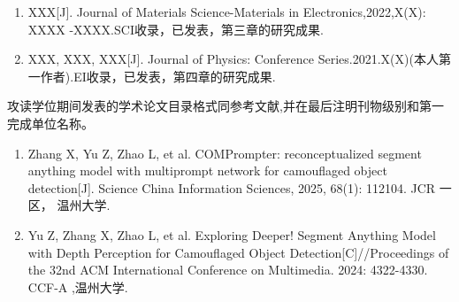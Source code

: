 \documentclass{wzuthesis} %
\begin{document}
\ifdefined\blind  %
    \begin{enumerate}
        \renewcommand{\labelenumi}{[\arabic{enumi}]}
        \setlength{\itemindent}{0em}
        \setlength{\labelsep}{0.5em}
  
        \item XXX[J]. Journal of Materials Science-Materials in Electronics,2022,X(X): XXXX -XXXX.SCI收录，已发表，第三章的研究成果.
        \item  XXX, XXX, XXX[J]. Journal of Physics: Conference Series.2021.X(X)(本人第一作者).EI收录，已发表，第四章的研究成果.
    \end{enumerate}
\else
    攻读学位期间发表的学术论文目录格式同参考文献,并在最后注明刊物级别和第一完成单位名称。
    \begin{enumerate}
        \renewcommand{\labelenumi}{[\arabic{enumi}]}
        \setlength{\itemindent}{0em}
        \setlength{\labelsep}{0.5em}
  
        \item Zhang X, Yu Z, Zhao L, et al. COMPrompter: reconceptualized segment anything model with multiprompt network for camouflaged object detection[J]. Science China Information Sciences, 2025, 68(1): 112104. JCR 一区， 温州大学.
        \item Yu Z, Zhang X, Zhao L, et al. Exploring Deeper! Segment Anything Model with Depth Perception for Camouflaged Object Detection[C]//Proceedings of the 32nd ACM International Conference on Multimedia. 2024: 4322-4330. CCF-A ,温州大学.
    \end{enumerate}
\fi

\newclearpage
\end{document}
